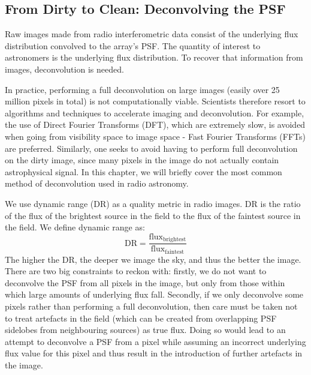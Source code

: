 \subsection{From Dirty to Clean: Deconvolving the PSF}\label{section.clean}

\pg
Raw images made from radio interferometric data consist of the underlying flux distribution convolved to the array's PSF. The quantity of interest to astronomers is the underlying flux distribution. To recover that information from images, deconvolution is needed.

\pg
In practice, performing a full deconvolution on large images (easily over 25 million pixels in total) is not computationally viable. Scientists therefore resort to algorithms and techniques to accelerate imaging and deconvolution. For example, the use of Direct Fourier Transforms (DFT), which are extremely slow, is avoided when going from visibility space to image space - Fast Fourier Transforms (FFTs) are preferred. Similarly, one seeks to avoid having to perform full deconvolution on the dirty image, since many pixels in the image do not actually contain astrophysical signal. In this chapter, we will briefly cover the most common method of deconvolution used in radio astronomy.

\pg
We use dynamic range (DR) as a quality metric in radio images. DR is the ratio of the flux of the brightest source in the field to the flux of the faintest source in the field.  We define dynamic range as:
\begin{equation}\label{eq.DR.imag}
\mathrm{DR} = \frac{\mathrm{flux}_\mathrm{brightest}}{\mathrm{flux}_\mathrm{faintest}}
\end{equation}
The higher the DR, the deeper we image the sky, and thus the better the image. There are two big constraints to reckon with: firstly, we do not want to deconvolve the PSF from all pixels in the image, but only from those within which large amounts of underlying flux fall. Secondly, if we only deconvolve some pixels rather than performing a full deconvolution, then care must be taken not to treat artefacts in the field (which can be created from overlapping PSF sidelobes from neighbouring sources) as true flux. Doing so would lead to an attempt to deconvolve a PSF from a pixel while assuming an incorrect underlying flux value for this pixel and thus result in the introduction of further artefacts in the image.

